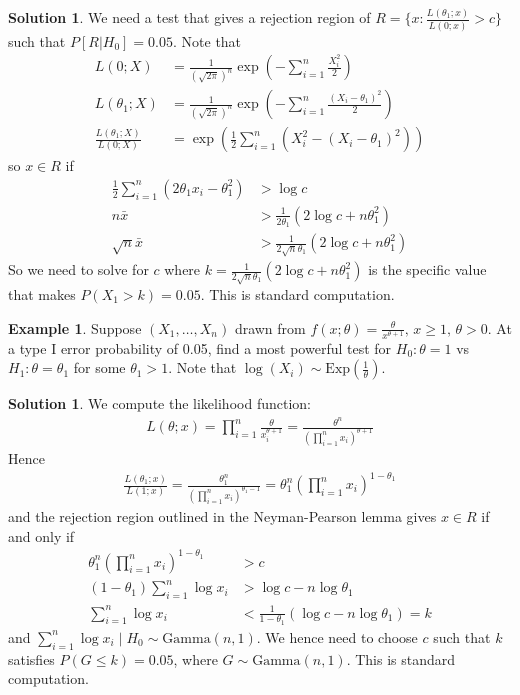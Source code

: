 \documentclass[11pt]{amsart}
\theoremstyle{definition}
\newtheorem{example}[theorem]{Example}
\newtheorem{solution}[theorem]{Solution}
\numberwithin{equation}{section}
\begin{document}
\addtocounter{theorem}{-1}
\begin{solution}

    We need a test that gives a rejection region of $R=\{x:\frac{L(\theta_1;x)}{L(0;x)}>c\}$ such that $P[R|H_0]=0.05$. Note that 
    \begin{align*}
        L(0;X)&=\frac{1}{(\sqrt{2\pi})^n}\exp(-\sum_{i=1}^n\frac{X_i^2}{2})\\
        L(\theta_1;X)&=\frac{1}{(\sqrt{2\pi})^n}\exp(-\sum_{i=1}^n\frac{(X_i-\theta_1)^2}{2})\\
        \frac{L(\theta_1;X)}{L(0;X)}&=\exp(\frac{1}{2}\sum_{i=1}^n(X_i^2-(X_i-\theta_1)^2))
    \end{align*}
    so $x\in R$ if
    \begin{align*}
        \frac{1}{2}\sum_{i=1}^n(2\theta_1x_i-\theta_1^2)&>\log c\\
        n\bar x&>\frac{1}{2\theta_1}(2\log c+n\theta_1^2)\\
        \sqrt n\bar x&>\frac{1}{2\sqrt n\theta_1}(2\log c+n\theta_1^2)
    \end{align*}
    So we need to solve for $c$ where $k=\frac{1}{2\sqrt n\theta_1}(2\log c+n\theta_1^2)$ is the specific value that makes $P(X_1>k)=0.05$. This is standard computation.
\end{solution}
\begin{example}
    Suppose $(X_1,\ldots,X_n)$ drawn from $f(x;\theta)=\frac{\theta}{x^{\theta+1}},\, x\ge 1,\,\theta>0$. At a type I error probability of 0.05, find a most powerful test for $H_0:\theta=1$ vs $H_1:\theta=\theta_1$ for some $\theta_1>1$. Note that $\log(X_i)\sim\mathrm{Exp}(\frac{1}{\theta})$.
\end{example}
\begin{solution}
    We compute the likelihood function:
    \begin{align*}
        L(\theta;x)=\prod_{i=1}^n\frac{\theta}{x_i^{\theta+1}}=\frac{\theta^n}{\left(\prod_{i=1}^nx_i\right)^{\theta+1}}
    \end{align*}
    Hence
    \begin{align*}
        \frac{L(\theta_1;x)}{L(1;x)}=\frac{\theta_1^n}{(\prod_{i=1}^nx_i)^{\theta_1-1}}=\theta_1^n(\prod_{i=1}^nx_i)^{1-\theta_1}
    \end{align*}
    and the rejection region outlined in the Neyman-Pearson lemma gives $x\in R$ if and only if
    \begin{align*}
        \theta_1^n(\prod_{i=1}^nx_i)^{1-\theta_1}&>c\\
        (1-\theta_1)\sum_{i=1}^n\log x_i&>\log c-n\log \theta_1\\
        \sum_{i=1}^n\log x_i&<\frac{1}{1-\theta_1}(\log c-n\log\theta_1)=k
    \end{align*}
    and $\sum_{i=1}^n\log x_i\mid H_0\sim\mathrm{Gamma}(n,1)$. We hence need to choose $c$ such that $k$ satisfies $P(G\le k)=0.05$, where $G\sim\mathrm{Gamma}(n,1)$. This is standard computation.
\end{solution}
\end{document}
